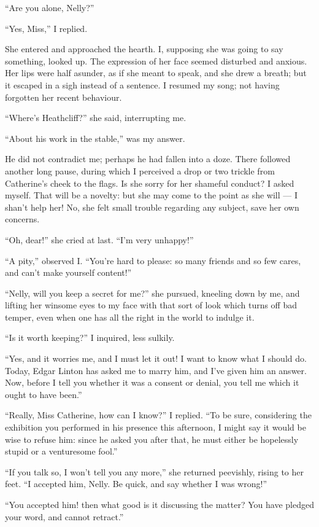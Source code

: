\par “Are you alone, Nelly?”
\par “Yes, Miss,” I replied.
\par She entered and approached the hearth. I, supposing she was going to say something, looked up. The expression of her face seemed disturbed and anxious. Her lips were half asunder, as if she meant to speak, and she drew a breath; but it escaped in a sigh instead of a sentence. I resumed my song; not having forgotten her recent behaviour.
\par “Where's Heathcliff?” she said, interrupting me.
\par “About his work in the stable,” was my answer.
\par He did not contradict me; perhaps he had fallen into a doze. There followed another long pause, during which I perceived a drop or two trickle from Catherine's cheek to the flags. Is she sorry for her shameful conduct? I asked myself. That will be a novelty: but she may come to the point as she will — I shan't help her! No, she felt small trouble regarding any subject, save her own concerns.
\par “Oh, dear!” she cried at last. “I'm very unhappy!”
\par “A pity,” observed I. “You're hard to please: so many friends and so few cares, and can't make yourself content!”
\par “Nelly, will you keep a secret for me?” she pursued, kneeling down by me, and lifting her winsome eyes to my face with that sort of look which turns off bad temper, even when one has all the right in the world to indulge it.
\par “Is it worth keeping?” I inquired, less sulkily.
\par “Yes, and it worries me, and I must let it out! I want to know what I should do. Today, Edgar Linton has asked me to marry him, and I've given him an answer. Now, before I tell you whether it was a consent or denial, you tell me which it ought to have been.”
\par “Really, Miss Catherine, how can I know?” I replied. “To be sure, considering the exhibition you performed in his presence this afternoon, I might say it would be wise to refuse him: since he asked you after that, he must either be hopelessly stupid or a venturesome fool.”
\par “If you talk so, I won't tell you any more,” she returned peevishly, rising to her feet. “I accepted him, Nelly. Be quick, and say whether I was wrong!”
\par “You accepted him! then what good is it discussing the matter? You have pledged your word, and cannot retract.”
